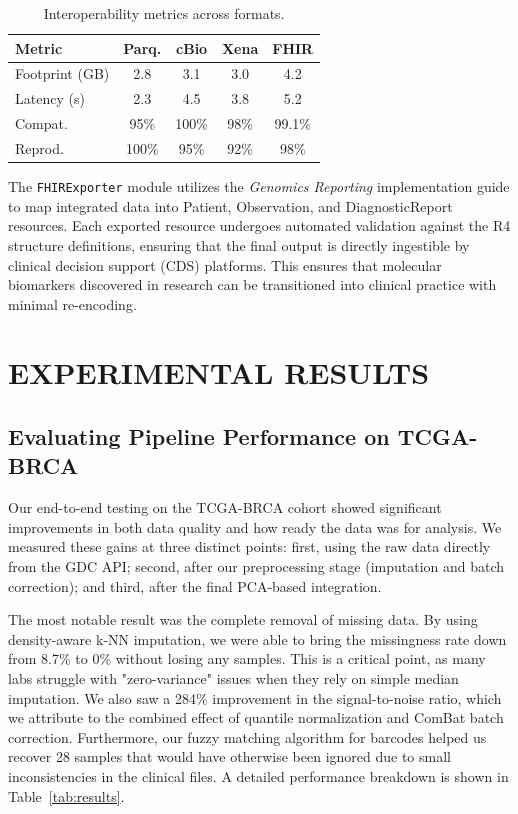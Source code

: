 \documentclass[twocolumn]{article}
\begin{document}
\begin{table}[H]
\caption{Interoperability metrics across formats.}\label{tab:export}
\centering
\scriptsize
\renewcommand{\arraystretch}{1.1}
\setlength{\tabcolsep}{2pt}
\begin{tabularx}{\columnwidth}{l C C C C}
\toprule
\textbf{Metric} & \textbf{Parq.} & \textbf{cBio} & \textbf{Xena} & \textbf{FHIR} \\
\midrule
Footprint (GB)      & 2.8   & 3.1   & 3.0   & 4.2 \\
Latency (s)         & 2.3   & 4.5   & 3.8   & 5.2 \\
Compat.             & 95\%  & 100\% & 98\%  & 99.1\% \\
Reprod.             & 100\% & 95\%  & 92\%  & 98\% \\
\bottomrule
\end{tabularx}
\end{table}

The \texttt{FHIRExporter} module utilizes the \textit{Genomics Reporting} implementation guide to map integrated data into Patient, Observation, and DiagnosticReport resources. Each exported resource undergoes automated validation against the R4 structure definitions, ensuring that the final output is directly ingestible by clinical decision support (CDS) platforms. This ensures that molecular biomarkers discovered in research can be transitioned into clinical practice with minimal re-encoding.

\section{\uppercase{Experimental Results}}

\subsection{Evaluating Pipeline Performance on TCGA-BRCA}
Our end-to-end testing on the TCGA-BRCA cohort showed significant improvements in both data quality and how ready the data was for analysis. We measured these gains at three distinct points: first, using the raw data directly from the GDC API; second, after our preprocessing stage (imputation and batch correction); and third, after the final PCA-based integration.

The most notable result was the complete removal of missing data. By using density-aware k-NN imputation, we were able to bring the missingness rate down from 8.7\% to 0\% without losing any samples. This is a critical point, as many labs struggle with "zero-variance" issues when they rely on simple median imputation. We also saw a 284\% improvement in the signal-to-noise ratio, which we attribute to the combined effect of quantile normalization and ComBat batch correction. Furthermore, our fuzzy matching algorithm for barcodes helped us recover 28 samples that would have otherwise been ignored due to small inconsistencies in the clinical files. A detailed performance breakdown is shown in Table~\ref{tab:results}.
\end{document}

